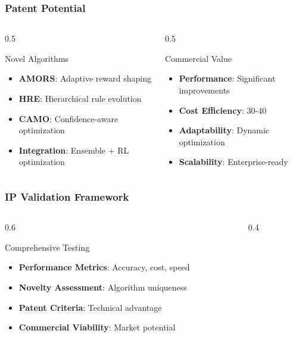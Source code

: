 \documentclass{beamer}
\begin{document}
\begin{frame}
\frametitle{Patent Potential}
\begin{columns}
\begin{column}{0.5\textwidth}
\begin{block}{Novel Algorithms}
\begin{itemize}
\item \textbf{AMORS}: Adaptive reward shaping
\item \textbf{HRE}: Hierarchical rule evolution
\item \textbf{CAMO}: Confidence-aware optimization
\item \textbf{Integration}: Ensemble + RL optimization
\end{itemize}
\end{block}
\end{column}
\begin{column}{0.5\textwidth}
\begin{block}{Commercial Value}
\begin{itemize}
\item \textbf{Performance}: Significant improvements
\item \textbf{Cost Efficiency}: 30-40%
\item \textbf{Adaptability}: Dynamic optimization
\item \textbf{Scalability}: Enterprise-ready
\end{itemize}
\end{block}
\end{column}
\end{columns}
\end{frame}

\begin{frame}
\frametitle{IP Validation Framework}
\begin{columns}
\begin{column}{0.6\textwidth}
\begin{block}{Comprehensive Testing}
\begin{itemize}
\item \textbf{Performance Metrics}: Accuracy, cost, speed
\item \textbf{Novelty Assessment}: Algorithm uniqueness
\item \textbf{Patent Criteria}: Technical advantage
\item \textbf{Commercial Viability}: Market potential
\end{itemize}
\end{block}
\end{column}
\begin{column}{0.4\textwidth}
\begin{center}
\end{center}
\end{column}
\end{columns}
\end{frame}
\end{document}
